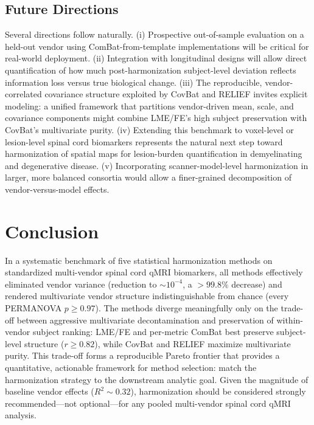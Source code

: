\documentclass[12pt,a4paper]{article}
\begin{document}
\subsection{Future Directions}

Several directions follow naturally. (i) Prospective out-of-sample evaluation on a held-out vendor using ComBat-from-template implementations will be critical for real-world deployment. (ii) Integration with longitudinal designs will allow direct quantification of how much post-harmonization subject-level deviation reflects information loss versus true biological change. (iii) The reproducible, vendor-correlated covariance structure exploited by CovBat and RELIEF invites explicit modeling: a unified framework that partitions vendor-driven mean, scale, and covariance components might combine LME/FE's high subject preservation with CovBat's multivariate purity. (iv) Extending this benchmark to voxel-level or lesion-level spinal cord biomarkers represents the natural next step toward harmonization of spatial maps for lesion-burden quantification in demyelinating and degenerative disease. (v) Incorporating scanner-model-level harmonization in larger, more balanced consortia would allow a finer-grained decomposition of vendor-versus-model effects.

\section{Conclusion}

In a systematic benchmark of five statistical harmonization methods on standardized multi-vendor spinal cord qMRI biomarkers, all methods effectively eliminated vendor variance (reduction to $\sim 10^{-4}$, a $>99.8\%$ decrease) and rendered multivariate vendor structure indistinguishable from chance (every PERMANOVA $p \geq 0.97$). The methods diverge meaningfully only on the trade-off between aggressive multivariate decontamination and preservation of within-vendor subject ranking: LME/FE and per-metric ComBat best preserve subject-level structure ($r \geq 0.82$), while CovBat and RELIEF maximize multivariate purity. This trade-off forms a reproducible Pareto frontier that provides a quantitative, actionable framework for method selection: match the harmonization strategy to the downstream analytic goal. Given the magnitude of baseline vendor effects ($R^2 \sim 0.32$), harmonization should be considered strongly recommended---not optional---for any pooled multi-vendor spinal cord qMRI analysis.
\end{document}
